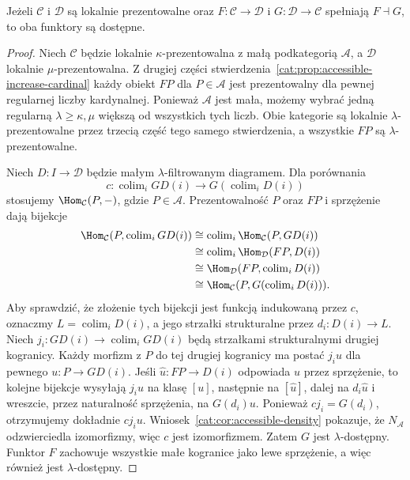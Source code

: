 \begin{stwierdzenie}\label{cat:prop:accessible-right-adjoint}
Jeżeli $\mathcal C$ i $\mathcal D$ są lokalnie prezentowalne oraz $F:\mathcal C\to\mathcal D$ i $G:\mathcal D\to\mathcal C$ spełniają $F\dashv G$, to oba funktory są dostępne.
\end{stwierdzenie}
\begin{proof}
Niech $\mathcal C$ będzie lokalnie $\kappa$-prezentowalna z małą podkategorią $\mathcal A$, a $\mathcal D$ lokalnie $\mu$-prezentowalna. Z drugiej części stwierdzenia~\ref{cat:prop:accessible-increase-cardinal} każdy obiekt $FP$ dla $P\in\mathcal A$ jest prezentowalny dla pewnej regularnej liczby kardynalnej. Ponieważ $\mathcal A$ jest mała, możemy wybrać jedną regularną $\lambda\geq\kappa,\mu$ większą od wszystkich tych liczb. Obie kategorie są lokalnie $\lambda$-prezentowalne przez trzecią część tego samego stwierdzenia, a wszystkie $FP$ są $\lambda$-prezentowalne.

Niech $D:I\to\mathcal D$ będzie małym $\lambda$-filtrowanym diagramem. Dla porównania
\[
 c:\operatorname{colim}_iGD(i)\longrightarrow G(\operatorname{colim}_iD(i))
\]
stosujemy $\Hom_{\mathcal C}(P,-)$, gdzie $P\in\mathcal A$. Prezentowalność $P$ oraz $FP$ i sprzężenie dają bijekcje
\[
\begin{aligned}
 \Hom_{\mathcal C}(P,\operatorname{colim}_iGD(i))
 &\cong\operatorname{colim}_i\Hom_{\mathcal C}(P,GD(i))\\
 &\cong\operatorname{colim}_i\Hom_{\mathcal D}(FP,D(i))\\
 &\cong\Hom_{\mathcal D}(FP,\operatorname{colim}_iD(i))\\
 &\cong\Hom_{\mathcal C}(P,G(\operatorname{colim}_iD(i))).
\end{aligned}
\]
Aby sprawdzić, że złożenie tych bijekcji jest funkcją indukowaną przez $c$, oznaczmy $L=\operatorname{colim}_i D(i)$, a jego strzałki strukturalne przez $d_i:D(i)\to L$. Niech $j_i:GD(i)\to\operatorname{colim}_i GD(i)$ będą strzałkami strukturalnymi drugiej kogranicy. Każdy morfizm z $P$ do tej drugiej kogranicy ma postać $j_i u$ dla pewnego $u:P\to GD(i)$. Jeśli $\widehat u:FP\to D(i)$ odpowiada $u$ przez sprzężenie, to kolejne bijekcje wysyłają $j_i u$ na klasę $[u]$, następnie na $[\widehat u]$, dalej na $d_i\widehat u$ i wreszcie, przez naturalność sprzężenia, na $G(d_i)u$. Ponieważ $cj_i=G(d_i)$, otrzymujemy dokładnie $c j_i u$. Wniosek~\ref{cat:cor:accessible-density} pokazuje, że $N_{\mathcal A}$ odzwierciedla izomorfizmy, więc $c$ jest izomorfizmem. Zatem $G$ jest $\lambda$-dostępny. Funktor $F$ zachowuje wszystkie małe kogranice jako lewe sprzężenie, a więc również jest $\lambda$-dostępny.
\end{proof}

